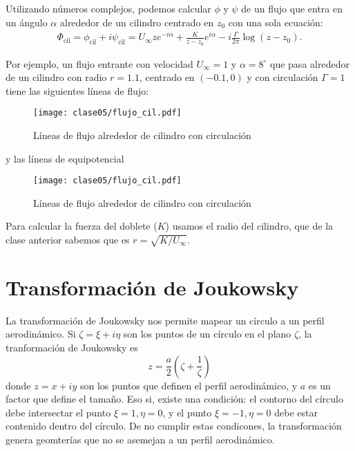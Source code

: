 Utilizando números complejos, podemos calcular $\phi$ y $\psi$ de un flujo que entra en un ángulo $\alpha$ alrededor de un cilindro centrado en $z_0$ con una sola ecuación:
%
\begin{align} \label{eq:cilindro}
\Phi_\text{cil} = \phi_\text{cil}+i\psi_\text{cil} = U_\infty z e^{-i\alpha} + \frac{K}{z-z_0}e^{i\alpha} -i\frac{\Gamma}{2\pi} \log(z-z_0).
\end{align}

Por ejemplo, un flujo entrante con velocidad $U_\infty=1$ y $\alpha=8^\circ$ que pasa alrededor de un cilindro con radio $r=1.1$, centrado en $(-0.1,0)$ y con circulación $\Gamma=1$ tiene las siguientes líneas de flujo:
%
\begin{figure}\label{fig:flujo_cil}
\centering
\texttt{[image: clase05/flujo\_cil.pdf]}
\caption{Líneas de flujo alrededor de cilindro con circulación}
\end{figure}
%
y las líneas de equipotencial
%
\begin{figure}\label{fig:flujo_cil}
\centering
\texttt{[image: clase05/flujo\_cil.pdf]}
\caption{Líneas de flujo alrededor de cilindro con circulación}
\end{figure}

Para calcular la fuerza del doblete ($K$) usamos el radio del cilindro, que de la clase anterior sabemos que es $r=\sqrt{K/U_\infty}$.

\section*{Transformación de Joukowsky}

La transformación de Joukowsky nos permite mapear un círculo a un perfil aerodinámico. 
Si $\zeta = \xi + i\eta$ son los puntos de un círculo en el plano $\zeta$, la tranformación de Joukowsky es
%
\begin{equation}
z = \frac{a}{2}\left(\zeta + \frac{1}{\zeta}\right)
\end{equation}
%
donde $z=x+iy$ son los puntos que definen el perfil aerodinámico, y $a$ es un factor que define el tamaño. 
Eso si, existe una condición: el contorno del círculo debe intersectar el punto $\xi=1, \eta=0$, y el punto $\xi=-1, \eta=0$ debe estar contenido dentro del círculo. 
De no cumplir estas condicones, la transformación genera geomterías que no se asemejan a un perfil aerodinámico.
